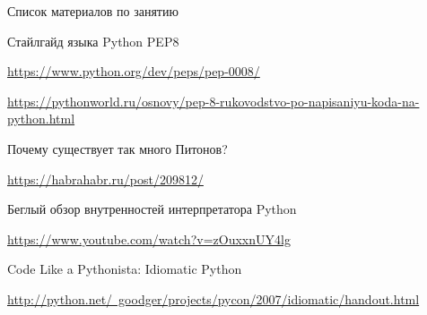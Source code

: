 \documentclass[11pt, fleqn, xcolor=x11names]{beamer}
\begin{document}
\begin{frame}{Список материалов по занятию}
\begin{thebibliography}{1}

\item Стайлгайд языка Python PEP8

\small{\href{https://www.python.org/dev/peps/pep-0008/}{https://www.python.org/dev/peps/pep-0008/}}

\small{\href{https://pythonworld.ru/osnovy/pep-8-rukovodstvo-po-napisaniyu-koda-na-python.html}{https://pythonworld.ru/osnovy/pep-8-rukovodstvo-po-napisaniyu-koda-na-python.html}}

\item Почему существует так много Питонов?

\small{\href{https://habrahabr.ru/post/209812/}{https://habrahabr.ru/post/209812/}}

\item Беглый обзор внутренностей интерпретатора Python

\small{\href{https://www.youtube.com/watch?v=zOuxxnUY4lg}{https://www.youtube.com/watch?v=zOuxxnUY4lg}}

\item Code Like a Pythonista: Idiomatic Python

\small{\href{http://python.net/~goodger/projects/pycon/2007/idiomatic/handout.html}{http://python.net/~goodger/projects/pycon/2007/idiomatic/handout.html}}


\end{thebibliography}


\end{frame}
\end{document}
